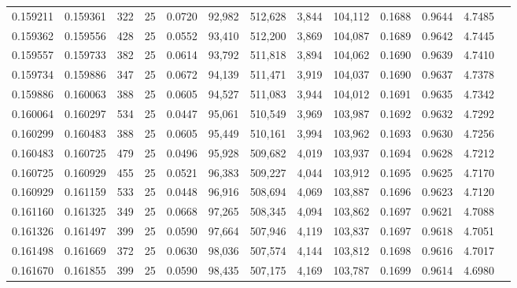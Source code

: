 \begin{tabular}{rrrrrrrrrrrrr}
0.159211 & 0.159361 &   322 &  25 &                                     0.0720 &  92,982 & 512,628 &   3,844 & 104,112 & 0.1688 & 0.9644 & 4.7485 \\
0.159362 & 0.159556 &   428 &  25 &                                     0.0552 &  93,410 & 512,200 &   3,869 & 104,087 & 0.1689 & 0.9642 & 4.7445 \\
0.159557 & 0.159733 &   382 &  25 &                                     0.0614 &  93,792 & 511,818 &   3,894 & 104,062 & 0.1690 & 0.9639 & 4.7410 \\
0.159734 & 0.159886 &   347 &  25 &                                     0.0672 &  94,139 & 511,471 &   3,919 & 104,037 & 0.1690 & 0.9637 & 4.7378 \\
0.159886 & 0.160063 &   388 &  25 &                                     0.0605 &  94,527 & 511,083 &   3,944 & 104,012 & 0.1691 & 0.9635 & 4.7342 \\
0.160064 & 0.160297 &   534 &  25 &                                     0.0447 &  95,061 & 510,549 &   3,969 & 103,987 & 0.1692 & 0.9632 & 4.7292 \\
0.160299 & 0.160483 &   388 &  25 &                                     0.0605 &  95,449 & 510,161 &   3,994 & 103,962 & 0.1693 & 0.9630 & 4.7256 \\
0.160483 & 0.160725 &   479 &  25 &                                     0.0496 &  95,928 & 509,682 &   4,019 & 103,937 & 0.1694 & 0.9628 & 4.7212 \\
0.160725 & 0.160929 &   455 &  25 &                                     0.0521 &  96,383 & 509,227 &   4,044 & 103,912 & 0.1695 & 0.9625 & 4.7170 \\
0.160929 & 0.161159 &   533 &  25 &                                     0.0448 &  96,916 & 508,694 &   4,069 & 103,887 & 0.1696 & 0.9623 & 4.7120 \\
0.161160 & 0.161325 &   349 &  25 &                                     0.0668 &  97,265 & 508,345 &   4,094 & 103,862 & 0.1697 & 0.9621 & 4.7088 \\
0.161326 & 0.161497 &   399 &  25 &                                     0.0590 &  97,664 & 507,946 &   4,119 & 103,837 & 0.1697 & 0.9618 & 4.7051 \\
0.161498 & 0.161669 &   372 &  25 &                                     0.0630 &  98,036 & 507,574 &   4,144 & 103,812 & 0.1698 & 0.9616 & 4.7017 \\
0.161670 & 0.161855 &   399 &  25 &                                     0.0590 &  98,435 & 507,175 &   4,169 & 103,787 & 0.1699 & 0.9614 & 4.6980 \\

\end{tabular}
